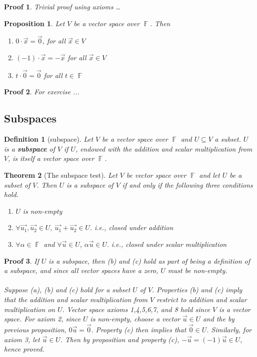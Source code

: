 \documentclass[10pt]{article}
\DeclareMathOperator{\F}{{\mathbb{F}}}
\theoremstyle{break}
\newtheorem{thm}{Theorem}[subsection]
\newtheorem*{pf}{Proof}
\newtheorem{defn}{Definition}[subsection]
\newtheorem{prop}[thm]{Proposition}
\begin{document}
\begin{pf}
    Trivial proof using axioms \dots
\end{pf}
\begin{prop}
    Let $V$ be a vector space over $\F$. Then 
    \begin{enumerate}
        \item $0 \cdot \vec{x} = \vec{0}$, for all $\vec{x} \in V$
        \item $(-1) \cdot \vec{x} = -\vec{x}$ for all $\vec{x} \in V$
        \item $t \cdot \vec{0} = \vec{0}$ for all $t \in \F$
    \end{enumerate}
\end{prop}
\begin{pf}
    For exercise ...
\end{pf}
\subsection{Subspaces}
\begin{defn}[subspace]
    Let $V$ be a vector space over $\F$ and $U \subseteq V$ a subset. $U$ is a \textbf{subspace} of $V$ if $U$, endowed with the addition and scalar multiplication from $V$, is itself a vector space over $\F$.
\end{defn}
\begin{thm}[The subspace test]
    Let $V$ be vector space over $\F$ and let $U$ be a subset of $V$. Then $U$ is a subspace of $V$ if and only if the following three conditions hold. 
    \begin{enumerate}
        \item[a.] $U$ is non-empty
        \item[b.] $\forall \vec{u_1}, \vec{u_2} \in U$, $\vec{u_1} + \vec{u_2} \in U$. i.e., closed under addition
        \item[c.] $\forall \alpha \in \F$ and $\forall \vec{u} \in U$, $\alpha \vec{u} \in U$. i.e., closed under scalar multiplication
    \end{enumerate}
\end{thm}
\begin{pf}
    If $U$ is a subspace, then (b) and (c) hold as part of being a definition of a subspace, and since all vector spaces have a zero, $U$ must be non-empty. \\ \vspace{0.5ex} \\
    Suppose (a), (b) and (c) hold for a subset $U$ of $V$. Properties (b) and (c)
    imply that the addition and scalar multiplication from $V$ restrict to addition and scalar
    multiplication on $U$. Vector space axioms 1,4,5,6,7, and 8 hold since $V$ is a vector space. For axiom 2, since $U$ is non-empty, choose a vector $\vec{u} \in U$ and the by previous proposition, $0\vec{u} = \vec{0}$. Property (c) then implies that $\vec{0} \in U$. 
    Similarly, for axiom 3, let $\vec{u} \in U$. Then by proposition and property (c), $-\vec{u} = (-1)\vec{u} \in U$, hence proved.
\end{pf}
\end{document}
